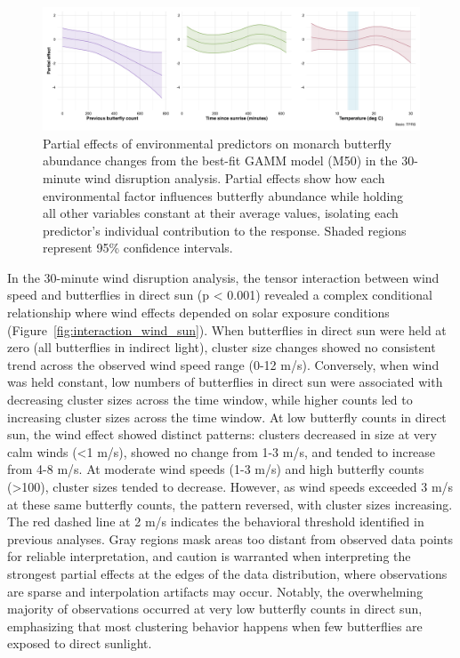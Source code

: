 \begin{figure}[htbp]
    \centering
    \includegraphics[width=\textwidth]{supplemental/results/30_min/figures/partial_effects_best_1x3.png}
    \caption[Partial effects of environmental predictors (M50)]{Partial effects of environmental predictors on monarch butterfly abundance changes from the best-fit GAMM model (M50) in the 30-minute wind disruption analysis. Partial effects show how each environmental factor influences butterfly abundance while holding all other variables constant at their average values, isolating each predictor's individual contribution to the response. Shaded regions represent 95\% confidence intervals.}
    \label{fig:partial_effects_30min}
\end{figure}

In the 30-minute wind disruption analysis, the tensor interaction between wind speed and butterflies in direct sun (p < 0.001) revealed a complex conditional relationship where wind effects depended on solar exposure conditions (Figure~\ref{fig:interaction_wind_sun}). When butterflies in direct sun were held at zero (all butterflies in indirect light), cluster size changes showed no consistent trend across the observed wind speed range (0-12 m/s). Conversely, when wind was held constant, low numbers of butterflies in direct sun were associated with decreasing cluster sizes across the time window, while higher counts led to increasing cluster sizes across the time window. At low butterfly counts in direct sun, the wind effect showed distinct patterns: clusters decreased in size at very calm winds (<1 m/s), showed no change from 1-3 m/s, and tended to increase from 4-8 m/s. At moderate wind speeds (1-3 m/s) and high butterfly counts (>100), cluster sizes tended to decrease. However, as wind speeds exceeded 3 m/s at these same butterfly counts, the pattern reversed, with cluster sizes increasing. The red dashed line at 2 m/s indicates the behavioral threshold identified in previous analyses. Gray regions mask areas too distant from observed data points for reliable interpretation, and caution is warranted when interpreting the strongest partial effects at the edges of the data distribution, where observations are sparse and interpolation artifacts may occur. Notably, the overwhelming majority of observations occurred at very low butterfly counts in direct sun, emphasizing that most clustering behavior happens when few butterflies are exposed to direct sunlight. 

